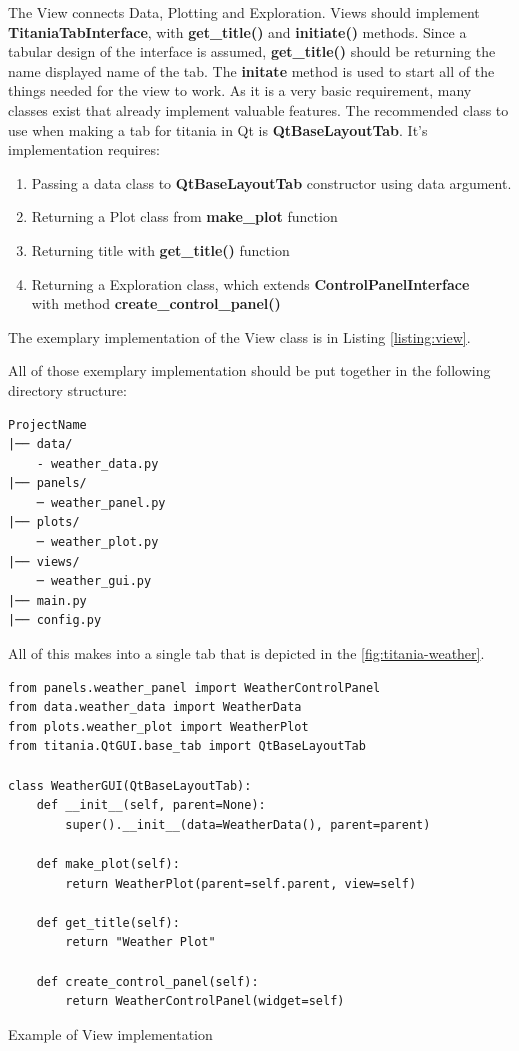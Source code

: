 The View connects Data, Plotting and Exploration. Views should implement \textbf{TitaniaTabInterface}, with \textbf{get\_title()} and \textbf{initiate()} methods.
Since a tabular design of the interface is assumed, \textbf{get\_title()} should be returning the name displayed name of the tab.
The \textbf{initate} method is used to start all of the things needed for the view to work.
As it is a very basic requirement, many classes exist that already implement valuable features.
The recommended class to use when making a tab for titania in Qt is \textbf{QtBaseLayoutTab}.
It's implementation requires:
\begin{enumerate}
\item Passing a data class to \textbf{QtBaseLayoutTab} constructor using data argument.
\item Returning a Plot class from \textbf{make\_plot} function
\item Returning title with \textbf{get\_title()} function
\item Returning a Exploration class, which extends \textbf{ControlPanelInterface} \\ with method \textbf{create\_control\_panel()}
\end{enumerate}
The exemplary implementation of the View class is in Listing \ref{listing:view}.


All of those exemplary implementation should be put together in the following directory structure:

\begin{listing}[!ht]
\begin{verbatim}
ProjectName
|── data/
    - weather_data.py
|── panels/
    ─ weather_panel.py
|── plots/
    ─ weather_plot.py
|── views/
    ─ weather_gui.py
|── main.py
|── config.py
\end{verbatim}
\end{listing}

All of this makes into a single tab that is depicted in the \ref{fig:titania-weather}.

\begin{listing}[!ht]
\begin{verbatim}
from panels.weather_panel import WeatherControlPanel
from data.weather_data import WeatherData
from plots.weather_plot import WeatherPlot
from titania.QtGUI.base_tab import QtBaseLayoutTab

class WeatherGUI(QtBaseLayoutTab):
    def __init__(self, parent=None):
        super().__init__(data=WeatherData(), parent=parent)

    def make_plot(self):
        return WeatherPlot(parent=self.parent, view=self)

    def get_title(self):
        return "Weather Plot"

    def create_control_panel(self):
        return WeatherControlPanel(widget=self)

\end{verbatim}
\caption{Example of View implementation}
\label{listing:view}
\end{listing}

